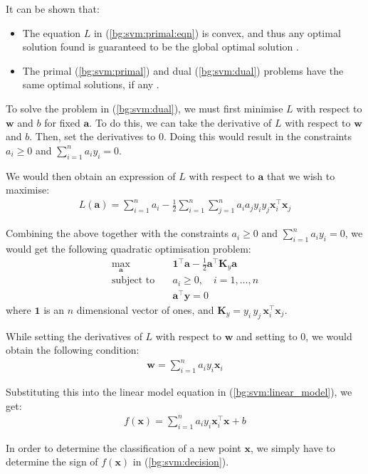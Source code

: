 \documentclass[12pt, twoside, a4paper]{report}
\def\vec{\boldsymbol}
\begin{document}
It can be shown that:
\begin{itemize}
\item The equation $L$ in (\ref{bg:svm:primal:eqn}) is convex, and thus any optimal solution found is guaranteed to be the global optimal solution \cite{RefWorks:123}.
\item The primal (\ref{bg:svm:primal}) and dual (\ref{bg:svm:dual}) problems have the same optimal solutions, if any \cite{RefWorks:124}.
\end{itemize}

To solve the problem in (\ref{bg:svm:dual}), we must first minimise $L$ with respect to $\vec w$ and $b$ for fixed $\vec a$. To do this, we can take the derivative of $L$ with respect to $\vec w$ and $b$. Then, set the derivatives to 0. Doing this would result in the constraints $a_i \geq 0$ and $\sum_{i=1}^n a_i y_i = 0$.

We would then obtain an expression of $L$ with respect to $\vec a$ that we wish to maximise:
\begin{align*}
L(\vec a) = \sum_{i=1}^n a_i - \frac{1}{2} \sum_{i=1}^n \sum_{j=1}^n a_i a_j y_i y_j \vec{x}_i^\top \vec{x}_j
\end{align*}

Combining the above together with the constraints $a_i \geq 0$ and $\sum_{i=1}^n a_i y_i = 0$, we would get the following quadratic optimisation problem:
\begin{align*}
\max_{\vec a} \quad &\vec{1}^\top \vec a - \frac{1}{2} \vec{a}^\top \vec{K}_y \vec{a} \\
\text{subject to} \quad &a_i \geq 0, \quad i = 1, \dots , n \\
&\vec{a}^\top \vec y = 0
\end{align*}
where $\vec{1}$ is an $n$ dimensional vector of ones, and $\vec{K}_y = y_i \, y_j \, \vec{x}_i^\top \vec{x}_j$.

While setting the derivatives of $L$ with respect to $\vec{w}$ and setting to 0, we would obtain the following condition:
\begin{align*}
\vec{w} = \sum_{i=1}^n a_i y_i \vec{x}_i
\end{align*}

Substituting this into the linear model equation in (\ref{bg:svm:linear_model}), we get:
\begin{align}
f(\vec{x}) = \sum_{i=1}^n a_i y_i \vec{x}_i^\top \vec{x} + b \label{bg:svm:decision}
\end{align}

In order to determine the classification of a new  point $\vec{x}$, we simply have to determine the sign of $f(\vec{x})$ in (\ref{bg:svm:decision}).
\end{document}
